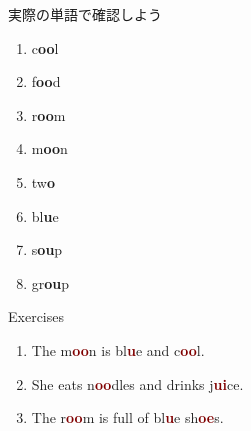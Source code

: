 \documentclass[aspectratio=169,xcolor={dvipsnames,table}]{beamer}
\begin{document}
\begin{frame}[plain]{実際の単語で確認しよう}
\LARGE
\hfill{\scriptsize {}}

\begin{enumerate}
 \item c\textcolor{NavyBlue}{\bfseries oo}l%
\hfill{}\hspace{150pt}\mbox{}
 \item f\textcolor{NavyBlue}{\bfseries oo}d%
\hfill{}\hspace{150pt}\mbox{}
\item r\textcolor{NavyBlue}{\bfseries oo}m%
\hfill{}\hspace{150pt}\mbox{}
 \item m\textcolor{NavyBlue}{\bfseries oo}n%
\hfill{}\hspace{150pt}\mbox{}
 \item tw\textcolor{NavyBlue}{\bfseries o}%
\hfill{}\hspace{150pt}\mbox{}
 \item bl\textcolor{NavyBlue}{\bfseries u}e%
\hfill{}\hspace{150pt}\mbox{} 
 \item s\textcolor{NavyBlue}{\bfseries ou}p%
\hfill{}\hspace{150pt}\mbox{}
 \item gr\textcolor{NavyBlue}{\bfseries ou}p%
\hfill{}\hspace{150pt}\mbox{}
\end{enumerate}
\end{frame}
\begin{frame}[plain]{Exercises }
\LARGE
\begin{enumerate}
 \item The m\textcolor{Maroon}{\bfseries oo}n is bl\textcolor{Maroon}{\bfseries u}e and c\textcolor{Maroon}{\bfseries oo}l.
 \item She eats n\textcolor{Maroon}{\bfseries oo}dles and drinks j\textcolor{Maroon}{\bfseries ui}ce.
 \item The r\textcolor{Maroon}{\bfseries oo}m is full of bl\textcolor{Maroon}{\bfseries u}e sh\textcolor{Maroon}{\bfseries oe}s.

\end{enumerate}
\hfill{\scriptsize {}}

\end{frame}
\end{document}

